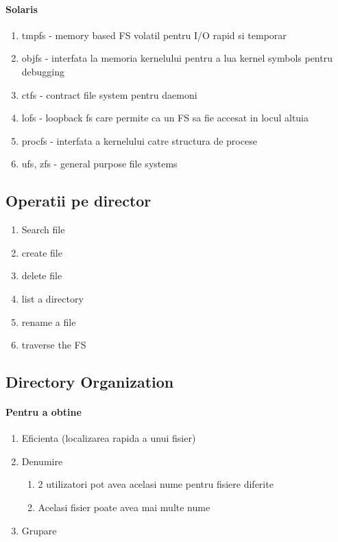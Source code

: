 \documentclass{article}
\begin{document}
\paragraph*{Solaris}
\begin{enumerate}
    \item tmpfs - memory based FS volatil pentru I/O rapid si temporar
    \item objfs - interfata la memoria kernelului pentru a lua kernel symbols pentru debugging
    \item ctfs - contract file system pentru daemoni
    \item lofs - loopback fs care permite ca un FS sa fie accesat in locul altuia
    \item procfs - interfata a kernelului catre structura de procese
    \item ufs, zfs - general purpose file systems
\end{enumerate}

\subsection*{Operatii pe director}
\begin{enumerate}
    \item Search file
    \item create file
    \item delete file
    \item list a directory
    \item rename a file
    \item traverse the FS
\end{enumerate}

\subsection*{Directory Organization}
\paragraph*{Pentru a obtine}
\begin{enumerate}
    \item Eficienta (localizarea rapida a unui fisier)
    \item Denumire
    \begin{enumerate}
        \item 2 utilizatori pot avea acelasi nume pentru fisiere diferite
        \item Acelasi fisier poate avea mai multe nume
    \end{enumerate}
    \item Grupare
\end{enumerate}
\end{document}
